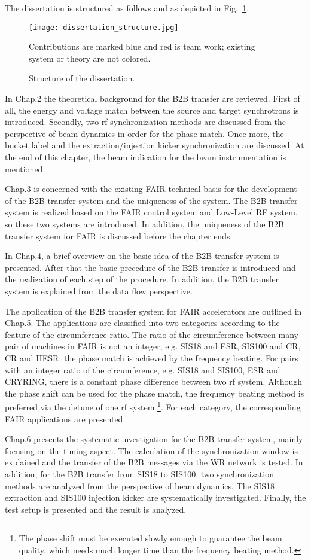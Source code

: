 The dissertation is structured as follows and as depicted in Fig.~\ref{dissertation_structure}.
\begin{figure}[!htb]
   \centering   
   \texttt{[image: dissertation\_structure.jpg]}
   \caption{Structure of the dissertation.}{Contributions are marked blue and red is team work; existing system or theory are not colored.}
   \label{dissertation_structure}
\end{figure}

In Chap.2 the theoretical background for the B2B transfer are reviewed. First of all, the energy and voltage match between the source and target synchrotrons is introduced. Secondly, two rf synchronization methods are discussed from the perspective of beam dynamics in order for the phase match. Once more, the bucket label and the extraction/injection kicker synchronization are discussed. At the end of this chapter, the beam indication for the beam instrumentation is mentioned.

Chap.3 is concerned with the existing FAIR technical basis for the development of the B2B transfer system and the uniqueness of the system. The B2B transfer system is realized based on the FAIR control system and Low-Level RF system, so these two systems are introduced. In addition, the uniqueness of the B2B transfer system for FAIR is discussed before the chapter ends. 

In Chap.4, a brief overview on the basic idea of the B2B transfer system is presented. After that the basic precedure of the B2B transfer is introduced and the realization of each step of the procedure. In addition, the B2B transfer system is explained from the data flow perspective.

The application of the B2B transfer system for FAIR accelerators are outlined in Chap.5. The applications are classified into two categories according to the feature of the circumference ratio. The ratio of the circumference between many pair of machines in FAIR is not an integer, e.g. SIS18 and ESR, SIS100 and CR, CR and HESR. the phase match is achieved by the frequency beating. For pairs with an integer ratio of the circumference, e.g. SIS18 and SIS100, ESR and CRYRING, there is a constant phase difference between two rf system. Although the phase shift can be used for the phase match, the frequency beating method is preferred via the detune of one rf system \footnote{The phase shift must be executed slowly enough to guarantee the beam quality, which needs much longer time than the frequency beating method.}. For each category, the corresponding FAIR applications are presented. 

Chap.6 presents the systematic investigation for the B2B transfer system, mainly focusing on the timing aspect. The calculation of the synchronization window is explained and the transfer of the B2B messages via the WR network is tested. In addition, for the B2B transfer from SIS18 to SIS100, two synchronization methods are analyzed from the perspective of beam dynamics. The SIS18 extraction and SIS100 injection kicker are systematically investigated. Finally, the test setup is presented and the result is analyzed.

%
%
